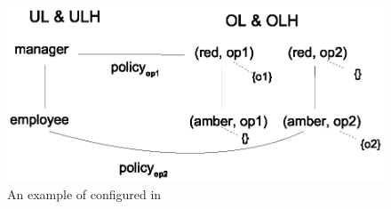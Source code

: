  \begin{figure}
 	\centering
 	\includegraphics[width=.7\textwidth]{ABAC16/two-sorted-rbac-to-labac-example}
 	\caption{An example of \twoSortedRBAC{} configured in \eapABAC{}}
 	\label{fig:two-sorted-rbac-to-labac-example}
 \end{figure}
 
